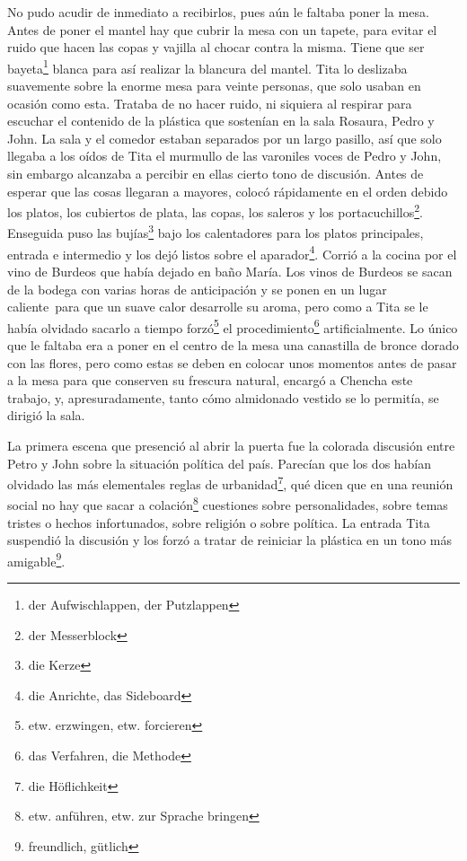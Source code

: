No pudo acudir de inmediato a recibirlos, pues aún le faltaba poner la
mesa. Antes de poner el mantel hay que cubrir la mesa con un tapete,
para evitar el ruido que hacen las copas y vajilla al chocar contra la
misma. Tiene que ser bayeta\footnote{der Aufwischlappen, der Putzlappen}
blanca para así realizar la blancura del mantel. Tita lo deslizaba
suavemente sobre la enorme mesa para veinte personas, que solo usaban en
ocasión como esta. Trataba de no hacer ruido, ni siquiera al respirar
para escuchar el contenido de la plástica que sostenían en la sala Rosaura,
Pedro y John. La sala y el comedor estaban separados por un largo
pasillo, así que solo llegaba a los oídos de Tita el murmullo de las
varoniles voces de Pedro y John, sin embargo
alcanzaba a percibir en ellas cierto tono de discusión. Antes de esperar
que las cosas llegaran a mayores, colocó rápidamente en el orden debido
los platos, los cubiertos de plata, las copas, los saleros y los portacuchillos\footnote{der Messerblock}. Enseguida
puso las bujías\footnote{die Kerze} bajo los calentadores para los
platos principales, entrada e intermedio y los dejó listos sobre el aparador\footnote{die Anrichte, das Sideboard}. Corrió a
la cocina por el vino de Burdeos que había dejado en baño María. Los
vinos de Burdeos se sacan de la bodega con varias horas
de anticipación y se ponen en un lugar caliente~para que un suave
calor desarrolle su aroma, pero como a Tita se le había olvidado sacarlo
a tiempo forzó\footnote{etw. erzwingen, etw. forcieren} el procedimiento\footnote{das Verfahren, die Methode}
artificialmente. Lo único que le faltaba era a poner en el centro de
la mesa una canastilla de bronce dorado con las flores, pero como
estas se deben en colocar unos momentos antes de pasar a la mesa para
que conserven su frescura natural, encargó a Chencha este trabajo, y,
apresuradamente, tanto cómo almidonado vestido se lo permitía, se dirigió la sala.

La primera escena que presenció al abrir la puerta fue la colorada
discusión entre Petro y John sobre la situación política del país.
Parecían que los dos habían olvidado las más elementales reglas de urbanidad\footnote{die Höflichkeit}, qué dicen que en una
reunión social no hay que sacar a colación\footnote{etw. anführen, etw. zur Sprache bringen}
cuestiones sobre personalidades, sobre temas tristes o hechos
infortunados, sobre religión o sobre política. La entrada Tita suspendió
la discusión y los forzó a tratar de reiniciar la plástica en un tono
más amigable\footnote{freundlich, gütlich}.

